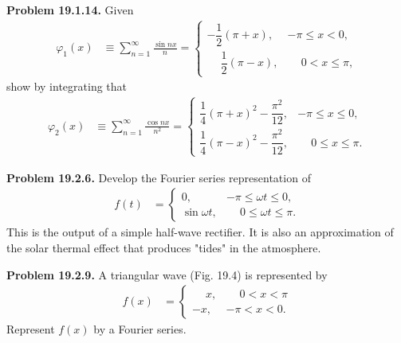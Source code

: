 \documentclass{article}
\begin{document}
\textbf{Problem 19.1.14.} Given
\begin{equation*}
\begin{aligned}
    \varphi_1(x) &\equiv \sum_{n=1}^\infty \frac{\sin nx}{n} =
    \begin{cases} 
      -\dfrac{1}{2}(\pi+x), &-\pi \leq x< 0, \\[1em]
      \phantom{-}\dfrac{1}{2}(\pi-x), &\phantom{-}0 <x\leq\pi,
   \end{cases}
\end{aligned}
\end{equation*}
show by integrating that
\begin{equation*}
\begin{aligned}
    \varphi_2(x) &\equiv \sum_{n=1}^\infty \frac{\cos nx}{n^2} =
    \begin{cases} 
      \dfrac{1}{4}(\pi+x)^2-\dfrac{\pi^2}{12}, &-\pi \leq x \leq 0, \\[1em]
      \dfrac{1}{4}(\pi-x)^2-\dfrac{\pi^2}{12}, &\phantom{-}0\leq x\leq\pi.
   \end{cases}
\end{aligned}
\end{equation*}
    
\hrulefill

\textbf{Problem 19.2.6.} Develop the Fourier series representation of
\begin{equation*}
\begin{aligned}
    f(t) &= 
    \begin{cases} 
        0, &-\pi\leq\omega t\leq0, \\[1em]
        \sin\omega t, &\phantom{-}0\leq\omega t\leq\pi.
    \end{cases}
\end{aligned}
\end{equation*}
This is the output of a simple half-wave rectifier. It is also an approximation of the solar thermal effect that produces "tides" in the atmosphere.

\hrulefill

\textbf{Problem 19.2.9.} A triangular wave (Fig. 19.4) is represented by
\begin{equation*}
\begin{aligned}
    f(x) &=
    \begin{cases} 
        \phantom{-}x, &\phantom{-}0<x<\pi \\[1em]
        -x, &-\pi<x<0.
    \end{cases}
\end{aligned}
\end{equation*}
Represent $f(x)$ by a Fourier series.
\end{document}
